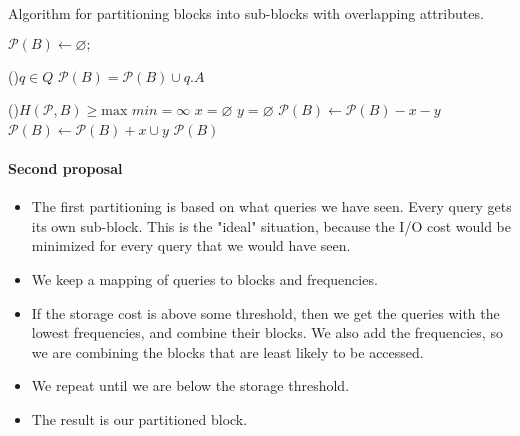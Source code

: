 \documentclass[twocolumn]{svjour3}          %
\let\emptyset\varnothing
\begin{document}
\begin{algorithm}[h]
\scriptsize
\caption{Algorithm for partitioning blocks into sub-blocks with overlapping attributes.}
\label{alg:overlappingP}
$\mathcal{P}(B) \leftarrow \emptyset;$  

\For(){$q \in Q$}{ 
 $\mathcal{P}(B) = \mathcal{P}(B) \cup q.A$ 
}

\While(){$H(\mathcal{P}, B) \geq \text{max}$}{
    $min = \infty$ \; 
    $x = \emptyset$ \;
    $y = \emptyset$ \;
$ \mathcal{P}(B)  \leftarrow \mathcal{P}(B) - x - y$ \;
 $\mathcal{P}(B)  \leftarrow \mathcal{P}(B)  + x \cup y$ \;
}
\Return $ \mathcal{P}(B)$  
\end{algorithm} 

\paragraph{Second proposal}

\begin{itemize}

\item The first partitioning is based on what queries we have seen.
Every query gets its own sub-block. This is the "ideal" situation,
because the I/O cost would be minimized for every query that we would
have seen.

\item We keep a mapping of queries to blocks and frequencies.

\item If the storage cost is above some threshold, then we get the queries with
  the lowest frequencies, and combine their blocks. We also add the frequencies,
  so we are combining the blocks that are least likely to be accessed. 

\item We repeat until we are below the storage threshold.

\item The result is our partitioned block.

\end{itemize}
\end{document}
